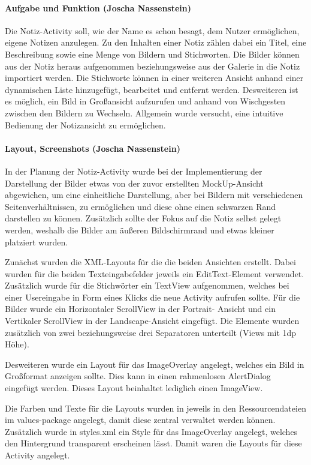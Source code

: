 \paragraph{Aufgabe und Funktion (Joscha Nassenstein)}
Die Notiz-Activity soll, wie der Name es schon besagt, dem Nutzer ermöglichen, eigene Notizen anzulegen. Zu den Inhalten einer Notiz zählen dabei ein Titel, eine Beschreibung sowie eine Menge von Bildern und Stichworten. Die Bilder können aus der Notiz heraus aufgenommen beziehungsweise aus der Galerie in die Notiz importiert werden. Die Stichworte können in einer weiteren Ansicht anhand einer dynamischen Liste hinzugefügt, bearbeitet und entfernt werden. Desweiteren ist es möglich, ein Bild in Großansicht aufzurufen und anhand von Wischgesten zwischen den Bildern zu Wechseln. Allgemein wurde versucht, eine intuitive Bedienung der Notizansicht zu ermöglichen.

\paragraph{Layout, Screenshots (Joscha Nassenstein)}
In der Planung der Notiz-Activity wurde bei der Implementierung der Darstellung der Bilder etwas von der zuvor erstellten MockUp-Ansicht abgewichen, um eine einheitliche Darstellung, aber bei Bildern mit verschiedenen Seitenverhältnissen, zu ermöglichen und diese ohne einen schwarzen Rand darstellen zu können. Zusätzlich sollte der Fokus auf die Notiz selbst gelegt werden, weshalb die Bilder am äußeren Bildschirmrand und etwas kleiner platziert wurden.

Zunächst wurden die XML-Layouts für die die beiden Ansichten erstellt. Dabei wurden für die beiden Texteingabefelder jeweils ein EditText-Element verwendet. Zusätzlich wurde für die Stichwörter ein TextView aufgenommen, welches bei einer Usereingabe in Form eines Klicks die neue Activity aufrufen sollte. Für die Bilder wurde ein Horizontaler ScrollView in der Portrait- Ansicht und ein Vertikaler ScrollView in der Landscape-Ansicht eingefügt. Die Elemente wurden zusätzlich von zwei beziehungsweise drei Separatoren unterteilt (Views mit 1dp Höhe).

Desweiteren wurde ein Layout für das ImageOverlay angelegt, welches ein Bild in Großformat anzeigen sollte. Dies kann in einen rahmenlosen AlertDialog eingefügt werden. Dieses Layout beinhaltet lediglich einen ImageView.

Die Farben und Texte für die Layouts wurden in jeweils in den Ressourcendateien im values-package angelegt, damit diese zentral verwaltet werden können. Zusätzlich wurde in styles.xml ein Style für das ImageOverlay angelegt, welches den Hintergrund transparent erscheinen lässt. Damit waren die Layouts für diese Activity angelegt.

